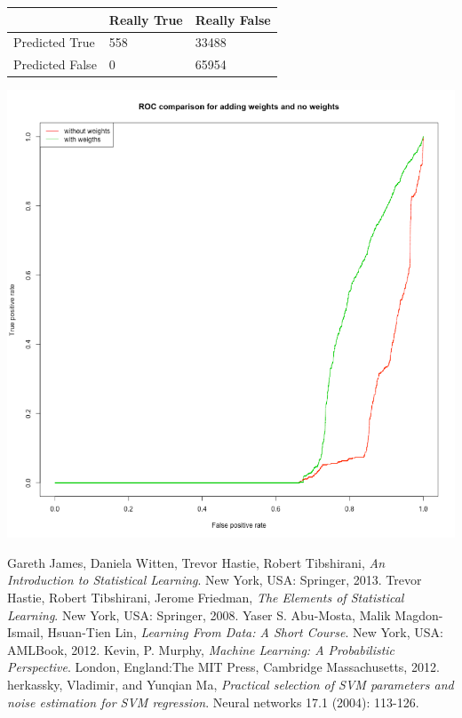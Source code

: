 \documentclass{article}
\begin{document}
\vspace{5mm}
\begin{tabular}{| l | l | l |}
\hline
  & Really True & Really False \\ \hline
Predicted True & 558 & 33488 \\ \hline
Predicted False & 0 & 65954\\
\hline
\end{tabular}
\vspace{5mm}

\includegraphics[scale = 0.8]{ROCwithandwithoutweights.png}

\begin{thebibliography}{9}
Gareth James, Daniela Witten, Trevor Hastie, Robert Tibshirani, \textit{An Introduction to Statistical Learning}. New York, USA: Springer, 2013.
Trevor Hastie, Robert Tibshirani, Jerome Friedman, \textit{The Elements of Statistical Learning}. New York, USA: Springer, 2008.
Yaser S. Abu-Mosta, Malik Magdon-Ismail, Hsuan-Tien Lin, \textit{Learning From Data: A Short Course}. New York, USA: AMLBook, 2012.
Kevin, P. Murphy, \textit{Machine Learning: A Probabilistic Perspective}. London, England:The MIT Press, Cambridge Massachusetts, 2012.
herkassky, Vladimir, and Yunqian Ma, \textit{Practical selection of SVM parameters and noise estimation for SVM regression}. Neural networks 17.1 (2004): 113-126.

\end{thebibliography}
\end{document}
